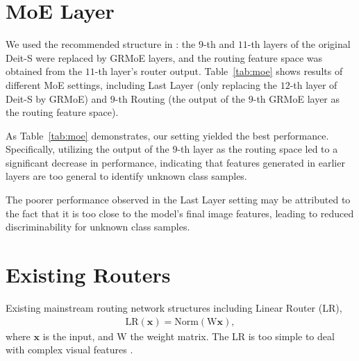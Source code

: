 \documentclass[10pt,twocolumn,letterpaper]{article}
\begin{document}
\section{MoE Layer} \label{sec:moe_stru}

We used the recommended structure in \cite{li2023sparse}: the $9$-th and $11$-th layers of the original Deit-S were replaced by GRMoE layers, and the routing feature space was obtained from the $11$-th layer's router output. Table~\ref{tab:moe} shows results of different MoE settings, including Last Layer (only replacing the $12$-th layer of Deit-S by GRMoE) and $9$-th Routing (the output of the $9$-th GRMoE layer as the routing feature space).

As Table~\ref{tab:moe} demonstrates, our setting yielded the best performance. Specifically, utilizing the output of the $9$-th layer as the routing space led to a significant decrease in performance, indicating that features generated in earlier layers are too general to identify unknown class samples.

The poorer performance observed in the Last Layer setting may be attributed to the fact that it is too close to the model's final image features, leading to reduced discriminability for unknown class samples.

\begin{table}[h]    \centering
   \caption{HOS (\%) on Office31, OfficeHome, and VisDA with different MoE settings.}
   \addtolength{\tabcolsep}{3.0pt}
       \label{tab:moe}
\end{table}

\section{Existing Routers} \label{sec:Routers}

Existing mainstream routing network structures including Linear Router (LR),
\begin{align}
   \text{LR}(\bm{x}) = \text{Norm}(\text{W}\bm{x}),
\end{align}
where $\bm{x}$ is the input, and $\text{W}$ the weight matrix. The LR is too simple to deal with complex visual features \cite{li2023sparse}. 
\end{document}
